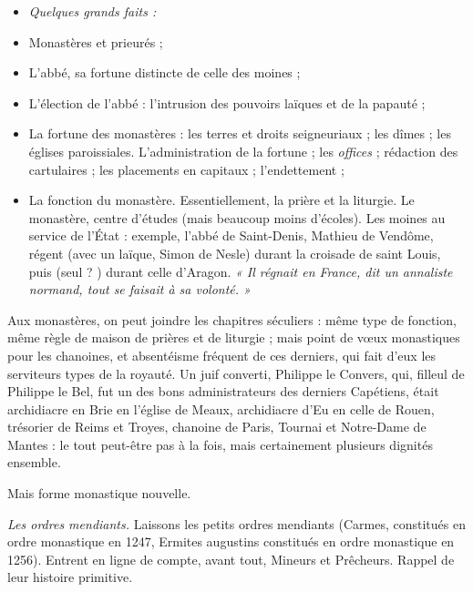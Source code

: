 \documentclass[french,twoside]{book} %
\newlength{\listmod}
\newcommand{\listhead}[1]{\hspace{-1\listmod}\emph{#1}}
\newcommand{\labelchar}[1]{{\color{rubric}\bf #1}}
\begin{document}
\begin{itemize}[itemsep=0pt,]
\item[]\listhead{Quelques grands faits :}
\item Monastères et prieurés ;
\item L’abbé, sa fortune distincte de celle des moines ;
\item L’élection de l’abbé : l’intrusion des pouvoirs laïques et de la papauté ;
\item La fortune des monastères : les terres et droits seigneuriaux ; les dîmes ; les églises paroissiales. L’administration de la fortune ; les \emph{offices} ; rédaction des cartulaires ; les placements en capitaux ; l’endettement ;
\item La fonction du monastère. Essentiellement, la prière et la liturgie. Le monastère, centre d’études (mais beaucoup moins d’écoles). Les moines au service de l’État : exemple, l’abbé de Saint-Denis, Mathieu de Vendôme, régent (avec un laïque, Simon de Nesle) durant la croisade de saint Louis, puis (seul ? ) durant celle d’Aragon. \emph{« Il régnait en France, dit un annaliste normand, tout se faisait à sa volonté. »}
\end{itemize}
\noindent Aux monastères, on peut joindre les chapitres séculiers : même type de fonction, même règle de maison de prières et de liturgie ; mais point de vœux monastiques pour les chanoines, et absentéisme fréquent de ces derniers, qui fait d’eux les serviteurs types de la royauté. Un juif converti, Philippe le Convers, qui, filleul de Philippe le Bel, fut un des bons administrateurs des derniers Capétiens, était archidiacre en Brie en l’église de Meaux, archidiacre d’Eu en celle de Rouen, trésorier de Reims et Troyes, chanoine de Paris, Tournai et Notre-Dame de Mantes : le tout peut-être pas à la fois, mais certainement plusieurs dignités ensemble.\par
Mais forme monastique nouvelle.\par
\bigbreak
\noindent \labelchar{2)} {\itshape Les ordres mendiants.} Laissons les petits ordres mendiants (Carmes, constitués en ordre monastique en 1247, Ermites augustins constitués en ordre monastique en 1256). Entrent en ligne de compte, avant tout, Mineurs et Prêcheurs. Rappel de leur histoire primitive.\par
\end{document}

